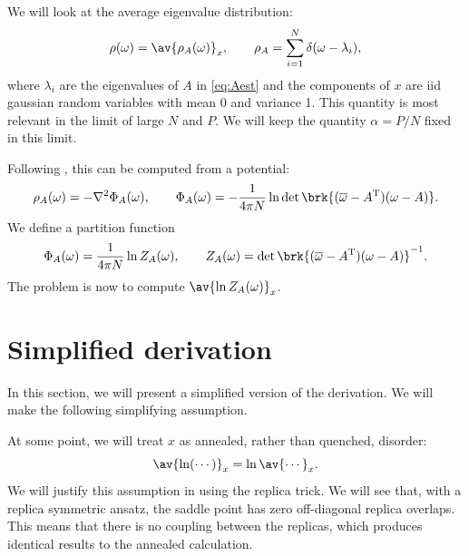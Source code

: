 \documentclass[12pt]{article}
\newcommand{\inv}{^{-1}}
\newcommand{\trans}{^\mathrm{T}}
\newcommand{\omb}{\overline{\omega}}
\begin{document}
We will look at the average eigenvalue distribution:
%
\begin{equation}\label{eq:eigdist}
  \rho(\omega) = \av{\rho_A(\omega)}_x,
  \qquad
  \rho_A = \sum_{i=1}^N \delta(\omega-\lambda_i),
\end{equation}
%
where $\lambda_i$ are the eigenvalues of $A$ in \eqref{eq:Aest} and
the components of $x$ are iid gaussian random variables with mean 0 and variance 1.
This quantity is most relevant in the limit of large $N$ and $P$.
We will keep the quantity $\alpha=P/N$ fixed in this limit.

Following \cite{Sommers1988asymmetric}, this can be computed from a potential:
%
\begin{equation}\label{eq:potential}
  \rho_A(\omega) = -\nabla^2 \Phi_A(\omega),
  \qquad
  \Phi_A(\omega) = -\frac{1}{4\pi N} \ln\det \brk{(\omb-A\trans)(\omega-A)}.
\end{equation}
%
We define a partition function
%
\begin{equation}\label{eq:partfn}
  \Phi_A(\omega) = \frac{1}{4\pi N} \ln Z_A(\omega),
  \qquad
  Z_A(\omega) = \det \brk{(\omb-A\trans)(\omega-A)}\inv.
\end{equation}
%
The problem is now to compute $\av{\ln Z_A(\omega)}_x$.



\section{Simplified derivation}\label{sec:simplederiv}

In this section, we will present a simplified version of the derivation.
We will make the following simplifying assumption.

At some point, we will treat $x$ as annealed, rather than quenched, disorder:
%
\begin{equation}\label{eq:annealed}
  \av{\ln (\cdots)}_x = \ln\av{\cdots}_x.
\end{equation}
%
We will justify this assumption in  using the replica trick.
We will see that, with a replica symmetric ansatz, the saddle point has zero off-diagonal replica overlaps.
This means that there is no coupling between the replicas, which produces identical results to the annealed calculation.
\end{document}
